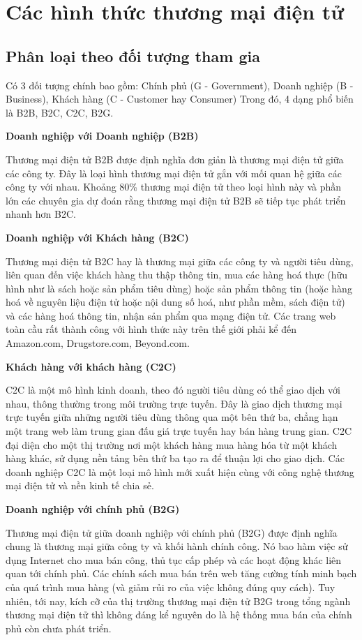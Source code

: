 \documentclass[12pt]{article}
\begin{document}
\section{Các hình thức thương mại điện tử}
\subsection{Phân loại theo đối tượng tham gia}
Có 3 đối tượng chính bao gồm: Chính phủ (G - Government), Doanh nghiệp (B - Business), Khách hàng (C - Customer hay Consumer)
Trong đó, 4 dạng phổ biến là B2B, B2C, C2C, B2G.


\textbf {Doanh nghiệp với Doanh nghiệp (B2B)}

Thương mại điện tử B2B được định nghĩa đơn giản là thương mại điện tử giữa các công ty. Đây là loại hình thương mại điện tử gắn với mối quan hệ giữa các công ty với nhau. Khoảng 80\% thương mại điện tử theo loại hình này và phần lớn các chuyên gia dự đoán rằng thương mại điện tử B2B sẽ tiếp tục phát triển nhanh hơn B2C.


\textbf{Doanh nghiệp với Khách hàng (B2C)}

Thương mại điện tử B2C hay là thương mại giữa các công ty và người tiêu dùng, liên quan đến việc khách hàng thu thập thông tin, mua các hàng hoá thực (hữu hình như là sách hoặc sản phẩm tiêu dùng) hoặc sản phẩm thông tin (hoặc hàng hoá về nguyên liệu điện tử hoặc nội dung số hoá, như phần mềm, sách điện tử) và các hàng hoá thông tin, nhận sản phẩm qua mạng điện tử. Các trang web toàn cầu rất thành công với hình thức này trên thế giới phải kể đến Amazon.com, Drugstore.com, Beyond.com.

\textbf{Khách hàng với khách hàng (C2C)}

C2C là một mô hình kinh doanh, theo đó người tiêu dùng có thể giao dịch với nhau, thông thường trong môi trường trực tuyến. Đây là giao dịch thương mại trực tuyến giữa những người tiêu dùng thông qua một bên thứ ba, chẳng hạn một trang web làm trung gian đấu giá trực tuyến hay bán hàng trung gian. C2C đại diện cho một thị trường nơi một khách hàng mua hàng hóa từ một khách hàng khác, sử dụng nền tảng bên thứ ba tạo ra để thuận lợi cho giao dịch. Các doanh nghiệp C2C là một loại mô hình mới xuất hiện cùng với công nghệ thương mại điện tử và nền kinh tế chia sẻ.

\textbf{Doanh nghiệp với chính phủ (B2G)}

Thương mại điện tử giữa doanh nghiệp với chính phủ (B2G) được định nghĩa chung là thương mại giữa công ty và khối hành chính công. Nó bao hàm việc sử dụng Internet cho mua bán công, thủ tục cấp phép và các hoạt động khác liên quan tới chính phủ. Các chính sách mua bán trên web tăng cường tính minh bạch của quá trình mua hàng (và giảm rủi ro của việc không đúng quy cách). Tuy nhiên, tới nay, kích cỡ của thị trường thương mại điện tử B2G trong tổng ngành thương mại điện tử thì không đáng kể nguyên do là hệ thống mua bán của chính phủ còn chưa phát triển.
\end{document}
